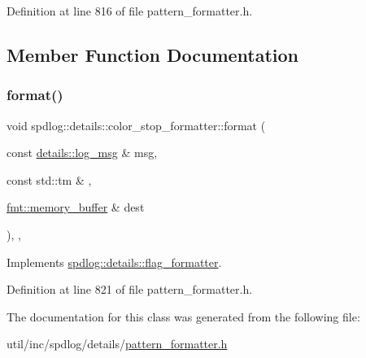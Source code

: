Definition at line 816 of file pattern\+\_\+formatter.\+h.



\subsection{Member Function Documentation}
\mbox{\label{classspdlog_1_1details_1_1color__stop__formatter_ac59e274cc3d37db75f0e7ea3dc484209}} 
\subsubsection{\texorpdfstring{format()}{format()}}
{\footnotesize\ttfamily void spdlog\+::details\+::color\+\_\+stop\+\_\+formatter\+::format (\begin{DoxyParamCaption}\item[{const \hyperlink{structspdlog_1_1details_1_1log__msg}{details\+::log\+\_\+msg} \&}]{msg,  }\item[{const std\+::tm \&}]{,  }\item[{\hyperlink{format_8h_a21cbf729f69302f578e6db21c5e9e0d2}{fmt\+::memory\+\_\+buffer} \&}]{dest }\end{DoxyParamCaption})\hspace{0.3cm}{\ttfamily [inline]}, {\ttfamily [override]}, {\ttfamily [virtual]}}



Implements \hyperlink{classspdlog_1_1details_1_1flag__formatter_a33fb3e42a4c8200cceb833d92b53fb67}{spdlog\+::details\+::flag\+\_\+formatter}.



Definition at line 821 of file pattern\+\_\+formatter.\+h.



The documentation for this class was generated from the following file\+:\begin{DoxyCompactItemize}
\item 
util/inc/spdlog/details/\hyperlink{pattern__formatter_8h}{pattern\+\_\+formatter.\+h}\end{DoxyCompactItemize}
